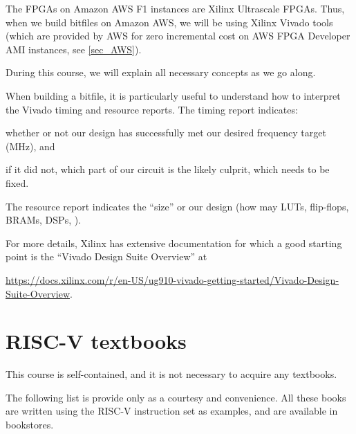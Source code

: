 The FPGAs on Amazon AWS F1 instances are Xilinx Ultrascale FPGAs.
Thus, when we build bitfiles on Amazon AWS, we will be using Xilinx
Vivado tools (which are provided by AWS for zero incremental cost on
AWS FPGA Developer AMI instances, see \ref{sec_AWS}).

During this course, we will explain all necessary concepts as we go
along.

When building a bitfile, it is particularly useful to understand how
to interpret the Vivado timing and resource reports.  The timing
report indicates:

\begin{tightlist}

  \item whether or not our design has successfully met our desired
    frequency target (MHz), and

  \item if it did not, which part of our circuit is the likely
  culprit, which needs to be fixed.

\end{tightlist}

The resource report indicates the ``size'' or our design (how may
LUTs, flip-flops, BRAMs, DSPs, {\etc}).

For more details, Xilinx has extensive documentation for which a good
starting point is the ``Vivado Design Suite Overview'' at

\url{https://docs.xilinx.com/r/en-US/ug910-vivado-getting-started/Vivado-Design-Suite-Overview}.


\section{RISC-V textbooks}

\label{apx_resources_RISCV_textbooks}

This course is self-contained, and it is not necessary to acquire any
textbooks.

The following list is provide only as a courtesy and convenience.  All
these books are written using the RISC-V instruction set as examples,
and are available in bookstores.

